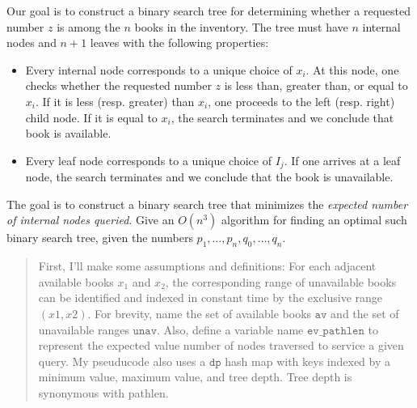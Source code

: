 \documentclass[11pt]{article}
\newcommand{\code}[1]{$\texttt{#1}$}
\begin{document}
\begin{enumerate}
Our goal is to construct a binary search tree for determining whether a requested number $z$ is among the $n$ books in the inventory. The tree must have $n$ internal nodes and $n + 1$ leaves with the following properties:
\begin{itemize}
    \item Every internal node corresponds to a unique choice of $x_i$. At this node, one checks whether the requested number $z$ is less than, greater than, or equal to $x_i$. If it is less (resp. greater) than $x_i$, one proceeds to the left (resp. right) child node. If it is equal to $x_i$, the search terminates and we conclude that book is available.
    \item Every leaf node corresponds to a unique choice of $I_j$. If one arrives at a leaf node, the search terminates and we conclude that the book is unavailable.
\end{itemize}
The goal is to construct a binary search tree that minimizes the \emph{expected number of internal nodes queried}. Give an $O(n^3)$ algorithm for finding an optimal such binary search tree, given the numbers $p_1,\ldots,p_n,q_0,\ldots,q_n$.
\begin{quote}
  \color{purple}
  First, I'll make some assumptions and definitions: For each adjacent available books $x_1$ and $x_2$, the corresponding range of unavailable books can be identified and indexed in constant time by the exclusive range $(x1, x2)$. For brevity, name the set of available books \code{av} and the set of unavailable ranges \code{unav}. Also, define a variable name \code{ev\_pathlen} to represent the expected value number of nodes traversed to service a given query. My pseuducode also uses a \code{dp} hash map with keys indexed by a minimum value, maximum value, and tree depth. Tree depth is synonymous with pathlen. 


\end{quote}
\end{enumerate}
\end{document}
